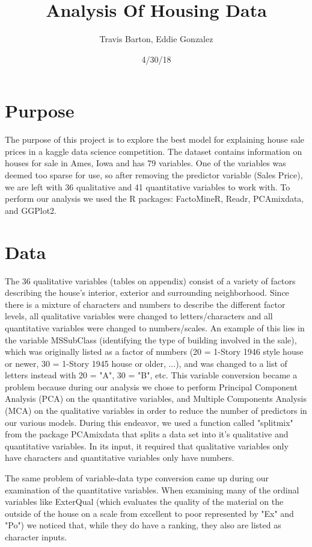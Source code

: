 \documentclass[11pt, oneside]{article}   	%
\title{Analysis Of Housing Data}
\author{Travis Barton, Eddie Gonzalez}
\date{4/30/18}							%
\begin{document}
\maketitle
\section{Purpose}
The purpose of this project is to explore the best model for explaining house sale prices in a kaggle data science competition. The dataset contains information on houses for sale in Ames, Iowa and has 79 variables. One of the variables was deemed too sparse for use, so after removing the predictor variable (Sales Price), we are left with 36 qualitative and 41 quantitative variables to work with. To perform our analysis we used the R packages: FactoMineR, Readr, PCAmixdata, and GGPlot2. 

\section{Data}
The 36 qualitative variables (tables on appendix) consist of a variety of factors describing the house's interior, exterior and surrounding neighborhood. Since there is a mixture of characters and numbers to describe the different factor levels, all qualitative variables were changed to letters/characters and all quantitative variables were changed to numbers/scales. An example of this lies in the variable MSSubClass (identifying the type of building involved in the sale), which was originally listed as a factor of numbers (20 = 1-Story 1946 style house or newer, 30 = 1-Story 1945 house or older, ...), and was changed to a list of letters instead with 20 = "A", 30 = "B", etc. This variable conversion became a problem because during our analysis we chose to perform Principal Component Analysis (PCA) on the quantitative variables, and Multiple Components Analysis (MCA) on the qualitative variables in order to reduce the number of predictors in our various models. During this endeavor, we used a function called "splitmix" from the package PCAmixdata that splits a data set into it's qualitative and quantitative variables. In its input, it required that qualitative variables only have characters and quantitative variables only have numbers. 

The same problem of variable-data type conversion came up during our examination of the quantitative variables. When examining many of the ordinal variables like ExterQual (which evaluates the quality of the material on the outside of the house on a scale from excellent to poor represented by "Ex" and "Po") we noticed that, while they do have a ranking, they also are listed as character inputs. 
\end{document}
